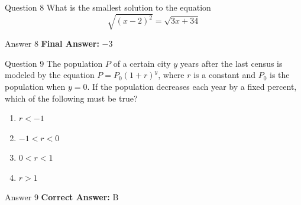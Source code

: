 \documentclass{beamer}
\begin{document}
\begin{frame}{Question 8}
\small
What is the smallest solution to the equation  
\[
\sqrt{(x - 2)^2} = \sqrt{3x + 34}
\]
\end{frame}
\begin{frame}{Answer 8}
\small
\textbf{Final Answer:} $\boxed{-3}$
\end{frame}

\begin{frame}{Question 9}
\small
The population $P$ of a certain city $y$ years after the last census is modeled by the equation  
$P = P_0(1 + r)^y$, where $r$ is a constant and $P_0$ is the population when $y = 0$.  
If the population decreases each year by a fixed percent, which of the following must be true?
\vspace{0.35cm}
\begin{enumerate}
    \item[A.] $r < -1$
    \item[B.] $-1 < r < 0$
    \item[C.] $0 < r < 1$
    \item[D.] $r > 1$
\end{enumerate}
\end{frame}
\begin{frame}{Answer 9}
\small
\textbf{Correct Answer:} B
\end{frame}
\end{document}
